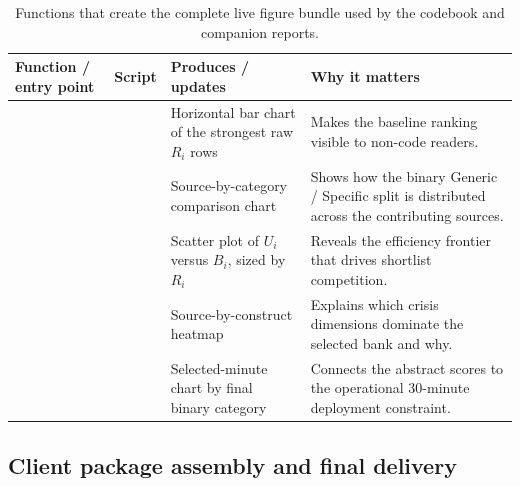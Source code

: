 \documentclass[12pt]{article}
\begin{document}
\begin{table}[H]
\centering
\footnotesize
\begin{tabularx}{\textwidth}{L{0.25\textwidth} L{0.19\textwidth} L{0.21\textwidth} Y}
\toprule
Function / entry point & Script & Produces / updates & Why it matters \\
\midrule
{} &  & Horizontal bar chart of the strongest raw $R_i$ rows & Makes the baseline ranking visible to non-code readers. \\
 &  & Source-by-category comparison chart & Shows how the binary Generic / Specific split is distributed across the contributing sources. \\
 &  & Scatter plot of $U_i$ versus $B_i$, sized by $R_i$ & Reveals the efficiency frontier that drives shortlist competition. \\
 &  & Source-by-construct heatmap & Explains which crisis dimensions dominate the selected bank and why. \\
 &  & Selected-minute chart by final binary category & Connects the abstract scores to the operational 30-minute deployment constraint. \\
\bottomrule
\end{tabularx}
\caption{Functions that create the complete live figure bundle used by the codebook and companion reports.}
\end{table}

\subsection{Client package assembly and final delivery}
\end{document}
